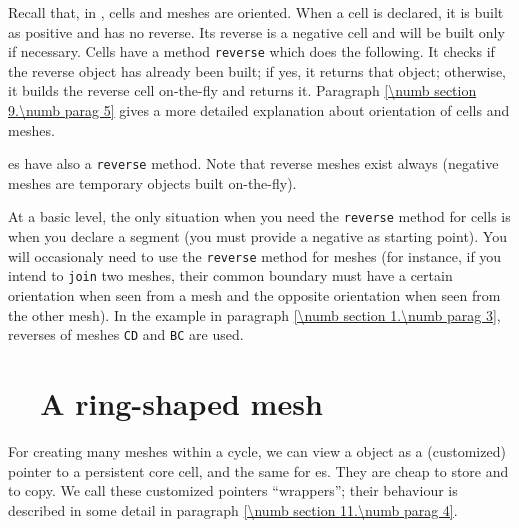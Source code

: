 Recall that, in \maniFEM, cells and meshes are oriented.
When a cell is declared, it is built as positive and has no reverse.
Its reverse is a negative cell and will be built only if necessary.
Cells have a method {\small\tt reverse} which does the following.
It checks if the reverse object has already been built; if yes, it returns that object;
otherwise, it builds the reverse cell on-the-fly and returns it.
Paragraph \ref{\numb section 9.\numb parag 5} gives a more detailed explanation about
orientation of cells and meshes.

{\small\tt {}}es have also a {\small\tt reverse} method.
Note that reverse meshes exist always (negative meshes are temporary objects built
on-the-fly).

At a basic level, the only situation when you need the {\small\tt reverse} method  for cells is
when you declare a segment {\small\tt {}} (you must provide a negative
{\small\tt {}} as starting point).
You will occasionaly need to use the {\small\tt reverse} method for meshes (for instance, if you
intend to {\small\tt join} two meshes, their common boundary must have a certain orientation when
seen from a mesh and the opposite orientation when seen from the other mesh).
In the example in paragraph \ref{\numb section 1.\numb parag 3},
reverses of meshes {\small\tt CD} and {\small\tt BC} are used.


\section{~~A ring-shaped mesh}\label{\numb section 9.\numb parag 2}

For creating many meshes within a cycle, we can view a {\small\tt {}} object as a
(customized) pointer to a persistent core cell, and the same for {\small\tt {}}es.
They are cheap to store and to copy.
We call these customized pointers ``wrappers''; their behaviour is described in some detail in
paragraph \ref{\numb section 11.\numb parag 4}.

